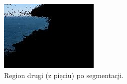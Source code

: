 \documentclass[10pt]{llncs}
\begin{document}
\begin{figure}[!htb]
  \includegraphics[width=\linewidth]{img/ship_k5_1.jpg}
  \caption{Region drugi (z pięciu) po segmentacji.}\label{fig:18}
\endminipage
\end{figure}
\end{document}
